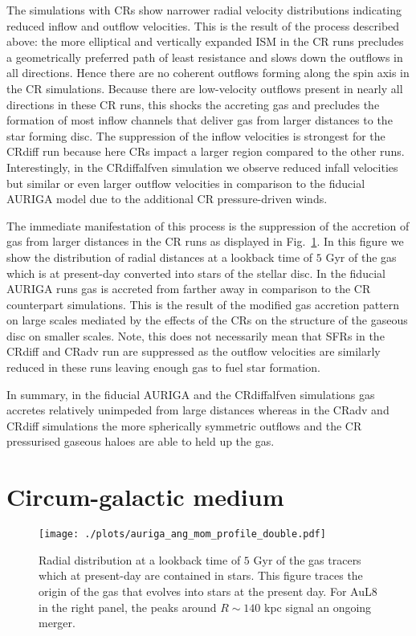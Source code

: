 \documentclass[useAMS,usenatbib]{mnras}
\begin{document}
The simulations with CRs show narrower radial velocity distributions indicating reduced inflow and outflow velocities. This is the result of the process described above: the more elliptical and vertically expanded ISM in the CR runs precludes a geometrically preferred path of least resistance and slows down the outflows in all directions. Hence there are no coherent outflows forming along the spin axis in the CR simulations. Because there are low-velocity outflows present in nearly all directions in these CR runs, this shocks the accreting gas and precludes the formation of most inflow channels that deliver gas from larger distances to the star forming disc. The suppression of the inflow velocities is strongest for the CRdiff run because here CRs impact a larger region compared to the other runs. Interestingly, in the CRdiffalfven simulation we observe reduced infall velocities but similar or even larger outflow velocities in comparison to the fiducial AURIGA model due to the additional CR pressure-driven winds.

The immediate manifestation of this process is the suppression of the accretion of gas from larger distances in the CR runs as displayed in Fig.\ \ref{fig:dist}. In this figure we show the distribution of radial distances at a lookback time of $5$ Gyr of the gas which is at present-day converted into stars of the stellar disc. In the fiducial AURIGA runs gas is accreted from farther away in comparison to the CR counterpart simulations. This is the result of the modified gas accretion pattern on large scales mediated by the effects of the CRs on the structure of the gaseous disc on smaller scales. Note, this does not necessarily mean that SFRs in the CRdiff and CRadv run are suppressed as the outflow velocities are similarly reduced in these runs leaving enough gas to fuel star formation.

In summary, in the fiducial AURIGA and the CRdiffalfven simulations gas accretes relatively unimpeded from large distances whereas in the CRadv and CRdiff simulations the more spherically symmetric outflows and the CR pressurised gaseous haloes are able to held up the gas.

\section{Circum-galactic medium} \label{sec:CGMprops}


\begin{figure}
\vspace*{-.5cm}
\begin{center}
\texttt{[image: ./plots/auriga\_ang\_mom\_profile\_double.pdf]}
\end{center}
\vspace{-.75cm}
\caption{Radial distribution at a lookback time of $5$ Gyr of the gas tracers which at present-day are contained in stars. This figure traces the origin of the gas that evolves into stars at the present day. For AuL8 in the right panel, the peaks around $R\sim140$ kpc signal an ongoing merger.}
\label{fig:dist}
\end{figure}
\end{document}

